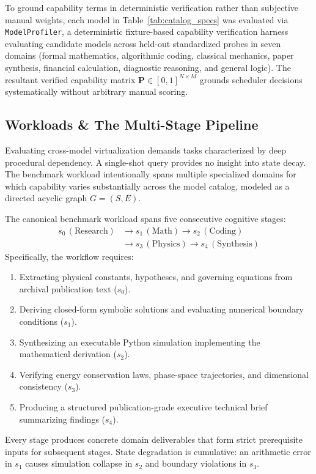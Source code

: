 To ground capability terms in deterministic verification rather than subjective manual weights, each model in Table~\ref{tab:catalog_specs} was evaluated via \texttt{ModelProfiler}, a deterministic fixture-based capability verification harness evaluating candidate models across held-out standardized probes in seven domains (formal mathematics, algorithmic coding, classical mechanics, paper synthesis, financial calculation, diagnostic reasoning, and general logic). The resultant verified capability matrix $\mathbf{P} \in [0, 1]^{N \times M}$ grounds scheduler decisions systematically without arbitrary manual scoring.

\subsection{Workloads \& The Multi-Stage Pipeline}
\label{sec:workload}

Evaluating cross-model virtualization demands tasks characterized by deep procedural dependency. A single-shot query provides no insight into state decay. The benchmark workload intentionally spans multiple specialized domains for which capability varies substantially across the model catalog, modeled as a directed acyclic graph $G = (S, E)$.

The canonical benchmark workload spans five consecutive cognitive stages:
\begin{equation}
\begin{aligned}
s_0\,(\text{Research}) &\longrightarrow s_1\,(\text{Math}) \longrightarrow s_2\,(\text{Coding}) \\
&\longrightarrow s_3\,(\text{Physics}) \longrightarrow s_4\,(\text{Synthesis})
\end{aligned}
\end{equation}
Specifically, the workflow requires:
\begin{enumerate}
    \item Extracting physical constants, hypotheses, and governing equations from archival publication text ($s_0$).
    \item Deriving closed-form symbolic solutions and evaluating numerical boundary conditions ($s_1$).
    \item Synthesizing an executable Python simulation implementing the mathematical derivation ($s_2$).
    \item Verifying energy conservation laws, phase-space trajectories, and dimensional consistency ($s_3$).
    \item Producing a structured publication-grade executive technical brief summarizing findings ($s_4$).
\end{enumerate}
Every stage produces concrete domain deliverables that form strict prerequisite inputs for subsequent stages. State degradation is cumulative: an arithmetic error in $s_1$ causes simulation collapse in $s_2$ and boundary violations in $s_3$.

